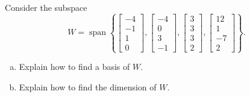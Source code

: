 
\begin{exerciseStatement}


Consider the subspace \[W=\operatorname{span}  \left\{ \left[\begin{array}{c}
-4 \\
-1 \\
1 \\
0
\end{array}\right] , \left[\begin{array}{c}
-4 \\
0 \\
3 \\
-1
\end{array}\right] , \left[\begin{array}{c}
3 \\
3 \\
3 \\
2
\end{array}\right] , \left[\begin{array}{c}
12 \\
1 \\
-7 \\
2
\end{array}\right] \right\} .\]


\begin{enumerate}[(a)]
\item  Explain how to find a basis of \(W\).
\item  Explain how to find the dimension of \(W\).
\end{enumerate}
    
\end{exerciseStatement}
    
